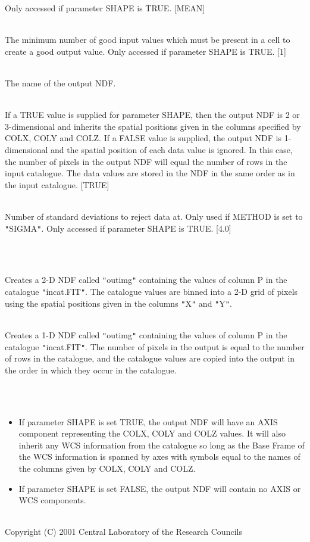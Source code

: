 \documentclass[twoside,11pt]{article}
\renewcommand{\_}{\texttt{\symbol{95}}}
\newlength{\sstexampleslength}
\newcommand{\sstexamples}[1]{
   \item[Examples:] \mbox{} \\
   \vspace{-3.5ex}
   \begin{description}
      #1
   \end{description}
}
\newcommand{\sstsubsection}[1]{ \item[{#1}] \mbox{} \\}
\newcommand{\sstexamplesubsection}[2]{\sloppy
\item[\parbox{\sstexampleslength}{\ssttt #1}] \mbox{} \vspace{1.0ex}
\\ #2 }
\newcommand{\sstnotes}[1]{\item[Notes:] \mbox{} \\[1.3ex] #1}
\newcommand{\sstdiytopic}[2]{\item[{\hspace{-0.35em}#1\hspace{-0.35em}:}]
\mbox{} \\[1.3ex] #2}
\newcommand{\sstitemlist}[1]{
  \mbox{} \\
  \vspace{-3.5ex}
  \begin{itemize}
     #1
  \end{itemize}
}
\newcommand{\sstitem}{\item}
\newcommand{\sstexamples}[1]{
      \item[Examples:] \\
      \begin{description}
         #1
      \end{description}
      \\
   }
\newcommand{\sstsubsection}[1]{\item[{#1}]}
\newcommand{\sstexamplesubsection}[2]{\item[{\ssttt #1}] #2}
\newcommand{\sstnotes}[1]{\item[Notes:] #1 }
\newcommand{\sstdiytopic}[2]{\item[{#1}] #2 }
\newcommand{\sstitemlist}[1]{
      \begin{itemize}
         #1
      \end{itemize}
      \\
   }
\newcommand{\sstitem}{\item}
\begin{document}
{{{{         }
         Only accessed if parameter SHAPE is TRUE. [MEAN]
      }
      \sstsubsection{
         MINVAL = \_INTEGER (Read)
      }{
         The minimum number of good input values which must be present in
         a cell to create a good output value. Only accessed if parameter
         SHAPE is TRUE. [1]
      }
      \sstsubsection{
         OUT = NDF (Read)
      }{
         The name of the output NDF.
      }
      \sstsubsection{
         SHAPE = \_LOGICAL (Read)
      }{
         If a TRUE value is supplied for parameter SHAPE, then the output
         NDF is 2 or 3-dimensional and inherits the spatial positions given
         in the columns specified by COLX, COLY and COLZ. If a FALSE value is
         supplied, the output NDF is 1-dimensional and the spatial position
         of each data value is ignored. In this case, the number of pixels
         in the output NDF will equal the number of rows in the input
         catalogue. The data values are stored in the NDF in the same order
         as in the input catalogue. [TRUE]
      }
      \sstsubsection{
         SIGMAS = \_REAL (Read)
      }{
         Number of standard deviations to reject data at. Only used if
         METHOD is set to {\tt "}SIGMA{\tt "}. Only accessed if parameter SHAPE is
         TRUE. [4.0]
      }
   }
   \sstexamples{
      \sstexamplesubsection{
         polimage incat outimg p
      }{
         Creates a 2-D NDF called {\tt "}outimg{\tt "} containing the values of column
         P in the catalogue {\tt "}incat.FIT{\tt "}. The catalogue values are binned
         into a 2-D grid of pixels using the spatial positions given in
         the columns {\tt "}X{\tt "} and {\tt "}Y{\tt "}.
      }
      \sstexamplesubsection{
         polimage incat outimg p noshape
      }{
         Creates a 1-D NDF called {\tt "}outimg{\tt "} containing the values of column
         P in the catalogue {\tt "}incat.FIT{\tt "}. The number of pixels in the output
         is equal to the number of rows in the catalogue, and the catalogue
         values are copied into the output in the order in which they occur
         in the catalogue.
      }
   }
   \sstnotes{
      \sstitemlist{

         \sstitem
         If parameter SHAPE is set TRUE, the output NDF will have an AXIS
         component representing the COLX, COLY and COLZ values. It will also
         inherit any WCS information from the catalogue so long as the Base
         Frame of the WCS information is spanned by axes with symbols equal
         to the names of the columns given by COLX, COLY and COLZ.

         \sstitem
         If parameter SHAPE is set FALSE, the output NDF will contain no AXIS 
         or WCS components.
      }
   }
   \sstdiytopic{
      Copyright
   }{
      Copyright (C) 2001 Central Laboratory of the Research Councils
   }
}
\end{document}
